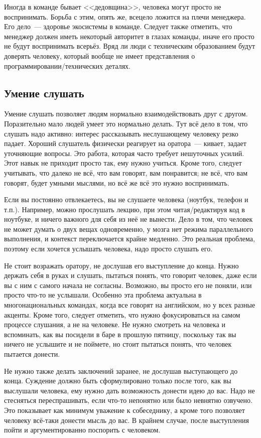 \documentclass{../../text-style}
\begin{document}
Иногда в команде бывает <<дедовщина>>, человека могут просто не воспринимать. Борьба с этим, опять же, всецело ложится на плечи менеджера. Его дело~--- здоровье экосистемы в команде. Следует также отметить, что менеджер должен иметь некоторый авторитет в глазах команды, иначе его просто не будут воспринимать всерьёз. Вряд ли люди с техническим образованием будут доверять человеку, который вообще не имеет представления о программировании/технических деталях.

\subsection{Умение слушать}

Умение слушать позволяет людям нормально взаимодействовать друг с другом. Поразительно мало людей умеет это нормально делать. Тут всё дело в том, что слушать надо активно: интерес рассказывать неслушающему человеку резко падает. Хороший слушатель физически реагирует на оратора~--- кивает, задает уточняющие вопросы. Это работа, которая часто требует нешуточных усилий. Этот навык не приходит просто так, ему нужно учиться. Кроме того, следует учитывать, что далеко не всё, что вам говорят, вам понравится; не всё, что вам говорят, будет умными мыслями, но всё же всё это нужно воспринимать.

Если вы постоянно отвлекаетесь, вы не слушаете человека (ноутбук, телефон и т.п.). Например, можно прослушать лекцию, при этом читая/редактируя код в ноутбуке, и ничего важного для себя из неё не вынести. Дело в том, что человек не может думать о двух вещах одновременно, у мозга нет режима параллельного выполнения, и контекст переключается крайне медленно. Это реальная проблема, поэтому если хочется услышать человека, надо просто слушать его.

Не стоит возражать оратору, не дослушав его выступление до конца. Нужно держать себя в руках и слушать, пытаться понять, что говорит человек, даже если вы с ним с самого начала не согласны. Возможно, вы просто его не поняли, или просто что-то не услышали. Особенно эта проблема актуальна в многонациональных командах, когда все говорят на английском, но у всех разные акценты. Кроме того, следует отметить, что нужно фокусироваться на самом процессе слушания, а не на человеке. Не нужно смотреть на человека и вспоминать, как вы посидели в баре в прошлую пятницу, поскольку так вы ничего не услышите и не поймете, но стоит пытаться понять, что человек пытается донести.

Не нужно также делать заключений заранее, не дослушав выступающего до конца. Суждение должно быть сформулировано только после того, как вы выслушали человека, ему нужно дать возможность донести идею до вас. Надо не стесняться переспрашивать, если что-то непонятно или было невнятно озвучено. Это показывает как минимум уважение к собеседнику, а кроме того позволяет человеку всё-таки донести мысль до вас. В крайнем случае, после выступления пойти и аргументированно поспорить с человеком.
\end{document}
